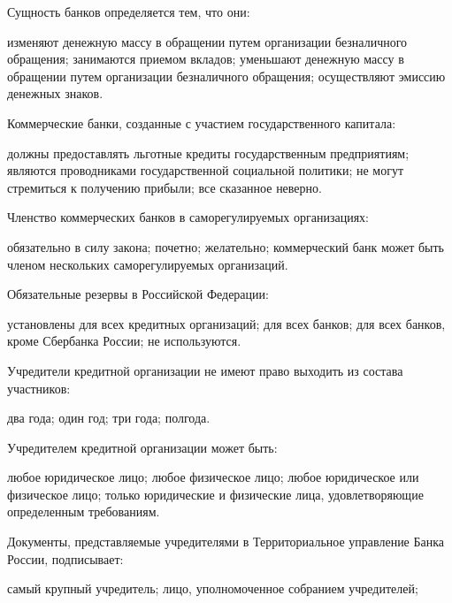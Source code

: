 \documentclass[12pt, table]{exam}
\begin{document}
\begin{questions}
\begin{multicols}{2}
\setlength{\columnsep}{1cm}

\question Сущность банков определяется тем, что они:
	 \begin{choices}
	 \CC изменяют денежную массу в обращении путем организации безналичного обращения;
	 \choice занимаются приемом вкладов;
	 \choice уменьшают денежную массу в обращении путем организации безналичного обращения;
	 \choice осуществляют эмиссию денежных знаков.
	 \end{choices}
\question Коммерческие банки, созданные с участием государственного капитала:
	 \begin{choices}
	 \choice должны предоставлять льготные кредиты государственным предприятиям;
	 \choice являются проводниками государственной социальной политики;
	 \choice не могут стремиться к получению прибыли;
	 \CC все сказанное неверно.
	 \end{choices}
\question Членство коммерческих банков в саморегулируемых организациях:
	 \begin{choices}
	 \choice обязательно в силу закона;
	 \choice почетно;
	 \choice желательно;
	 \CC коммерческий банк может быть членом нескольких саморегулируемых организаций.
	 \end{choices}
\question Обязательные резервы в Российской Федерации:
	 \begin{choices}
	 \choice установлены для всех кредитных организаций;
	 \CC для всех банков;
	 \choice для всех банков, кроме Сбербанка России;
	 \choice не используются.
	 \end{choices}
\question Учредители кредитной организации не имеют право выходить из состава участников:
	 \begin{choices}
	 \choice два года;
	 \choice один год;
	 \CC три года;
	 \choice полгода.
	 \end{choices}
\question Учредителем кредитной организации может быть:
	 \begin{choices}
	 \choice любое юридическое лицо;
	 \choice любое физическое лицо;
	 \CC любое юридическое или физическое лицо;
	 \choice только юридические и физические лица, удовлетворяющие определенным требованиям.
	 \end{choices}
\question Документы, представляемые учредителями в Территориальное управление Банка России, подписывает:
	 \begin{choices}
	 \choice самый крупный учредитель;
	 \CC лицо, уполномоченное собранием учредителей;

\end{choices}
\end{multicols}
\end{questions}
\end{document}
